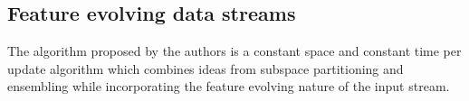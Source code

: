 \subsection{Feature evolving data streams}

The algorithm proposed by the authors is a constant space and constant time per update algorithm which combines ideas from subspace partitioning and ensembling while incorporating the feature evolving nature of the input stream. 





\appendix
